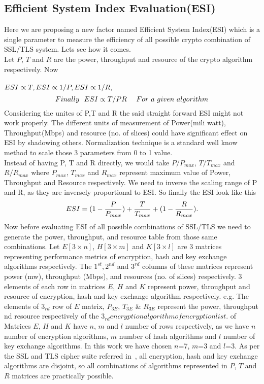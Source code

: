 \documentclass[3p,times]{elsarticle}
\begin{document}
\subsection{Efficient System Index Evaluation(ESI)}
Here we are proposing a new factor named Efficient System Index(ESI) which is a single parameter to measure the efficiency of all possible crypto combination of SSL/TLS system. Lets see how it comes.\\
Let $P$, $T$ and $R$ are the power, throughput and resource of the crypto algorithm respectively.
Now\\
\\
$ESI \propto T,\\
ESI \propto 1/P,\\
ESI \propto 1/R,\\$
\begin{equation}
Finally~~ESI \propto T/PR~~~~For~a~given~algorithm\\
\end{equation}
Considering the unites of P,T and R the said straight forward ESI might  not work properly. The different units of measurement of Power(mili watt), Throughput(Mbps) and resource (no. of slices) could have significant effect on ESI by shadowing others. Normalization technique is a standard well know method to scale those 3 parameters from 0 to 1 value.\\
 Instead of having P, T and R directly, we would take $P/P_{max}$, $T/T_{max}$ and $R/R_{max}$ where $P_{max}$, $T_{max}$ and $R_{max}$ represent maximum value of Power, Throughput and Resource respectively. We need to inverse the scaling range of P and R, as they are inversely proportional to ESI. So finally the ESI look like this\\
\begin{equation}
ESI=(1-\frac{P}{P_{max}}) + \frac{T}{T_{max}} +  (1-\frac{R}{R_{max}}).\\
\label{norm:equ}
\end{equation}
Now before evaluating ESI of all possible combinations of SSL/TLS we need to generate the power, throughput, and resource table from those same combinations.
 Let $E[3\times n]$, $H[3\times m]$ and $K[3\times l]$ are 3 matrices representing performance metrics of encryption, hash and key exchange algorithms respectively. The $ 1^{st}, 2^{nd}$ and $3^{rd}$ columns of these matrices represent power (mw), throughput (Mbps), and resources (no. of slices) respectively. 3 elements of each row in matrices $E$, $H$ and $K$ represent power, throughput and resource of encryption, hash and key exchange algorithm respectively. e.g. The elements of $3_{rd}$ row of $E$ matrix, $P_{3E}$, $T_{3E}$ \& $R_{3E}$ represent the power, throughput nd resource respectively of the $3_{rd} encryption algorithm of encryption list.$ of  Matrices $E$, $H$ and $K$ have $n$, $m$ and $l$ number of rows respectively, as we have $n$ number of encryption algorithms, $m$ number of hash algorithms and $l$ number of key exchange algorithms. In this work we have chosen $n$=7, $m$=3 and $l$=3. As per the SSL and TLS cipher suite referred in~\cite{Forouzan:book}, all encryption, hash and key exchange algorithms are disjoint, so all combinations of algorithms represented in $P$, $T$ and $R$ matrices are practically possible.
\end{document}
